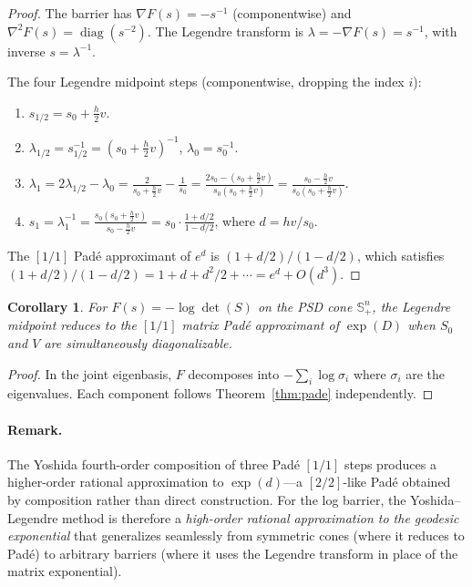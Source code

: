 \documentclass[11pt]{article}
\newtheorem{corollary}[theorem]{Corollary}
\begin{document}
\begin{proof}
The barrier has $\nabla F(s) = -s^{-1}$ (componentwise) and
$\nabla^2 F(s) = \operatorname{diag}(s^{-2})$.  The Legendre transform
is $\lambda = -\nabla F(s) = s^{-1}$, with inverse $s = \lambda^{-1}$.

The four Legendre midpoint steps (componentwise, dropping the index $i$):
\begin{enumerate}
  \item $s_{1/2} = s_0 + \frac{h}{2}v$.

  \item $\lambda_{1/2} = s_{1/2}^{-1} = (s_0 + \frac{h}{2}v)^{-1}$, \quad
        $\lambda_0 = s_0^{-1}$.

  \item $\lambda_1 = 2\lambda_{1/2} - \lambda_0
        = \frac{2}{s_0 + \frac{h}{2}v} - \frac{1}{s_0}
        = \frac{2s_0 - (s_0 + \frac{h}{2}v)}{s_0(s_0 + \frac{h}{2}v)}
        = \frac{s_0 - \frac{h}{2}v}{s_0(s_0 + \frac{h}{2}v)}$.

  \item $s_1 = \lambda_1^{-1}
        = \frac{s_0(s_0 + \frac{h}{2}v)}{s_0 - \frac{h}{2}v}
        = s_0 \cdot \frac{1 + d/2}{1 - d/2}$,
        \quad where $d = hv/s_0$.
\end{enumerate}
The $[1/1]$ Pad\'e approximant of $e^d$ is $(1+d/2)/(1-d/2)$, which
satisfies $(1+d/2)/(1-d/2) = 1 + d + d^2/2 + \cdots = e^d + O(d^3)$.
\end{proof}

\begin{corollary}
For $F(s) = -\log\det(S)$ on the PSD cone $\mathbb{S}^n_+$, the Legendre
midpoint reduces to the $[1/1]$ matrix Pad\'e approximant of $\exp(D)$
when $S_0$ and $V$ are simultaneously diagonalizable.
\end{corollary}
\begin{proof}
In the joint eigenbasis, $F$ decomposes into $-\sum_i \log \sigma_i$
where $\sigma_i$ are the eigenvalues.  Each component follows
Theorem~\ref{thm:pade} independently.
\end{proof}

\paragraph{Remark.}
The Yoshida fourth-order composition of three Pad\'e $[1/1]$ steps
produces a higher-order rational approximation to $\exp(d)$---a
$[2/2]$-like Pad\'e obtained by composition rather than direct
construction.  For the log barrier, the Yoshida--Legendre method is
therefore a \emph{high-order rational approximation to the geodesic
exponential} that generalizes seamlessly from symmetric cones (where
it reduces to Pad\'e) to arbitrary barriers (where it uses the
Legendre transform in place of the matrix exponential).
\end{document}
